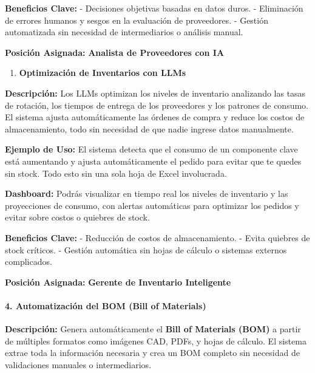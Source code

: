 \documentclass[
  10pt,
  letterpaper,
]{book}
\let\oldparagraph\paragraph
\renewcommand{\paragraph}[1]{\oldparagraph{#1}\mbox{}}
\providecommand{\tightlist}{%
  \setlength{\itemsep}{0pt}\setlength{\parskip}{0pt}}\usepackage{longtable,booktabs,array}
\begin{document}
\textbf{Beneficios Clave:} - Decisiones objetivas basadas en datos
duros. - Eliminación de errores humanos y sesgos en la evaluación de
proveedores. - Gestión automatizada sin necesidad de intermediarios o
análisis manual.

\textbf{Posición Asignada:} \textbf{Analista de Proveedores con IA}

\begin{enumerate}
\def\labelenumi{\arabic{enumi}.}
\setcounter{enumi}{2}
\tightlist
\item
  \textbf{Optimización de Inventarios con LLMs}
\end{enumerate}

\textbf{Descripción:} Los LLMs optimizan los niveles de inventario
analizando las tasas de rotación, los tiempos de entrega de los
proveedores y los patrones de consumo. El sistema ajusta automáticamente
las órdenes de compra y reduce los costos de almacenamiento, todo sin
necesidad de que nadie ingrese datos manualmente.

\textbf{Ejemplo de Uso:} El sistema detecta que el consumo de un
componente clave está aumentando y ajusta automáticamente el pedido para
evitar que te quedes sin stock. Todo esto sin una sola hoja de Excel
involucrada.

\textbf{Dashboard:} Podrás visualizar en tiempo real los niveles de
inventario y las proyecciones de consumo, con alertas automáticas para
optimizar los pedidos y evitar sobre costos o quiebres de stock.

\textbf{Beneficios Clave:} - Reducción de costos de almacenamiento. -
Evita quiebres de stock críticos. - Gestión automática sin hojas de
cálculo o sistemas externos complicados.

\textbf{Posición Asignada:} \textbf{Gerente de Inventario Inteligente}

\paragraph{\texorpdfstring{4. \textbf{Automatización del BOM (Bill of
Materials)}}{4. Automatización del BOM (Bill of Materials)}}\label{automatizaciuxf3n-del-bom-bill-of-materials}

\textbf{Descripción:} Genera automáticamente el \textbf{Bill of
Materials (BOM)} a partir de múltiples formatos como imágenes CAD, PDFs,
y hojas de cálculo. El sistema extrae toda la información necesaria y
crea un BOM completo sin necesidad de validaciones manuales o
intermediarios.
\end{document}

